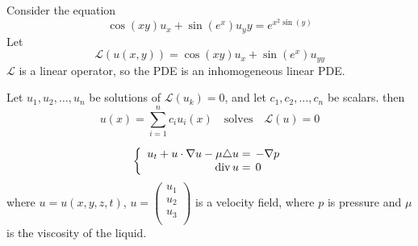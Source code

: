 \begin{example}
	Consider the equation
	\[ \cos(xy) u_x + \sin \left( e^x \right) u_yy = e^{x^2\sin (y)} \]
	Let 
	\[ \mathscr L(u(x,y)) = \cos(xy) u_x + \sin \left( e^x \right) u_{yy} \]
	$\mathscr L$ is a linear operator, so the PDE is an inhomogeneous linear PDE.
\end{example}
\begin{theorem}
	Let $u_1, u_2, \ldots, u_n$ be solutions of $\mathscr L(u_k) = 0$, and let $c_1, c_2, \ldots, c_n$ be scalars. then
	\[ u(x) = \sum_{i = 1}^{n} c_i u_i(x) \quad \mathrm{ solves } \quad \mathscr L(u) = 0\]
\end{theorem}
\begin{example}
	\[ \left\{\begin{array}{rl}
		u_t + u \cdot \nabla u - \mu \triangle u =& \hspace{-2mm} - \nabla p \\
		\mathrm{div}\, u =& \hspace{-2mm} 0 \end{array} \right.\]
		where $u = u(x,y,z,t)$, $u = \begin{pmatrix}
			u_1 \\
			u_2 \\
			u_3 \\
		\end{pmatrix}$ is a velocity field, where $p$ is pressure and $\mu$ is the viscosity of the liquid.
\end{example}


